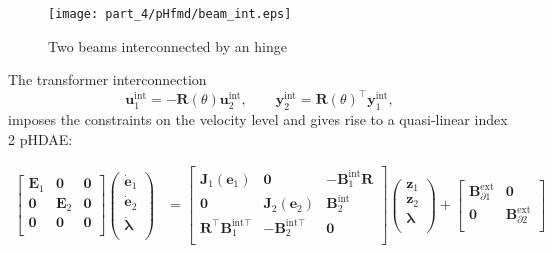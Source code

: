 \begin{figure}[t]
	\centering
	\texttt{[image: part\_4/pHfmd/beam\_int.eps]} 
	
	\caption{Two beams interconnected by an hinge }
	\label{fig:beam_int}
\end{figure}

The transformer interconnection
\begin{equation}
\label{eq:int_hinge}
\mathbf{u}_1^{\text{int}} = -\mathbf{R}(\theta) \mathbf{u}_2^{\text{int}}, \qquad
\mathbf{y}_2^{\text{int}} = \mathbf{R}(\theta)^\top \mathbf{y}_1^{\text{int}},
\end{equation}
imposes the constraints on the velocity level and gives rise to a quasi-linear index 2 pHDAE:

\begin{equation}
\label{eq:int_beams}
\begin{aligned}
\begin{bmatrix}
\mathbf{E}_1 & \mathbf{0} & \mathbf{0} \\ 
\mathbf{0} & \mathbf{E}_2 & \mathbf{0} \\
\mathbf{0} & \mathbf{0} & \mathbf{0} \\
\end{bmatrix}
\begin{pmatrix}
\dot{\mathbf{e}}_1 \\ \dot{\mathbf{e}}_2 \\ \dot{\bm{\lambda}} \\
\end{pmatrix} &= 
\begin{bmatrix}
\mathbf{J}_1(\mathbf{e}_1) & \mathbf{0} & -\mathbf{B}_1^{\text{int}} \mathbf{R} \\ 
\mathbf{0} & \mathbf{J}_2(\mathbf{e}_2) & \mathbf{B}_2^{\text{int}} \\
\mathbf{R}^\top \mathbf{B}_1^{\text{int} \top} & - \mathbf{B}_2^{\text{int} \top} & \mathbf{0} \\
\end{bmatrix}
\begin{pmatrix}
\mathbf{z}_1  \\ 
\mathbf{z}_2  \\ 
\bm{\lambda} \\
\end{pmatrix}+ 
\begin{bmatrix}
\mathbf{B}_{\partial 1}^{\text{ext}} & \mathbf{0} \\
\mathbf{0} & \mathbf{B}_{\partial 2}^{\text{ext}} \\

\end{bmatrix}
\end{aligned}
\end{equation}

